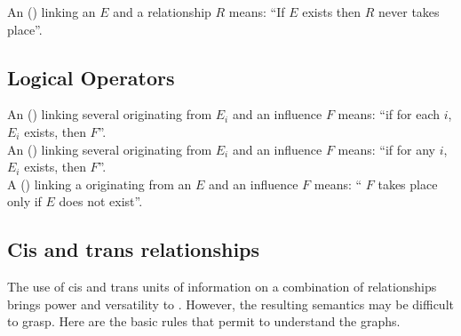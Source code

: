 \noindent
An  () linking an  $E$ and a relationship $R$ means: ``If $E$ exists then $R$ never takes place''. 
\\[\baselineskip]

\subsection{Logical Operators}

An  () linking several  originating from  $E_i$ and an influence $F$ means: ``if for each $i$, $E_i$ exists, then $F$''.\\[\baselineskip]

\noindent
An  () linking several  originating from  $E_i$ and an influence $F$ means: ``if for any $i$, $E_i$ exists, then $F$''.\\[\baselineskip]

\noindent
A  () linking a  originating from an  $E$ and an influence $F$ means: `` $F$ takes place only if $E$ does not exist''.\\[\baselineskip]


\subsection{Cis and trans relationships}\label{sec:cis-trans-semantics}

The use of cis and trans units of information on a combination of relationships brings power and versatility to \ERs. However, the resulting semantics may be difficult to grasp. Here are the basic rules that permit to understand the graphs.

